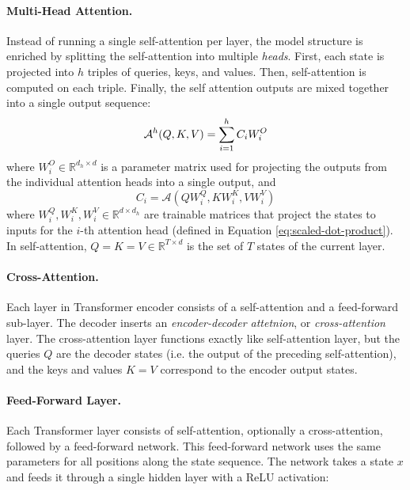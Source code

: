 \paragraph{Multi-Head Attention.} Instead of running a single self-attention
per layer, the model structure is enriched by splitting the self-attention into
multiple \emph{heads}. First, each state is projected into $h$ triples of
queries, keys, and values. Then, self-attention is computed on each triple.
Finally, the self attention outputs are mixed together into a single output
sequence:
%
\begin{equation}
  \mathcal{A}^h(Q, K, V) = \sum_{i=1}^h C_i W_i^O \\
\end{equation}
%
where $W_i^O \in \mathbb{R}^{d_h \times d}$ is a parameter matrix used for
projecting the outputs from the individual attention heads into a single
output, and
%
\begin{equation}
  C_i = \mathcal{A}(QW_i^Q, KW_i^K, VW_i^V)
\end{equation}
where $W_i^Q, W_i^K, W_i^V \in \mathbb{R}^{d \times d_h}$ are trainable
matrices that project the states to inputs for the $i$-th attention head
(defined in Equation \ref{eq:scaled-dot-product}). In self-attention,
$Q = K = V \in \mathbb{R}^{T \times d}$ is the set of $T$ states of the current
layer.

\paragraph{Cross-Attention.} Each layer in Transformer encoder consists of a
self-attention and a feed-forward sub-layer. The decoder inserts an
\emph{encoder-decoder attetnion}, or \emph{cross-attention} layer.  The
cross-attention layer functions exactly like self-attention layer, but the
queries $Q$ are the decoder states (i.e. the output of the preceding
self-attention), and the keys and values $K = V$ correspond to the encoder
output states.

\paragraph{Feed-Forward Layer.} Each Transformer layer consists
of self-attention, optionally a cross-attention, followed by a feed-forward
network. This feed-forward network uses the same parameters for all positions
along the state sequence. The network takes a state $x$ and feeds it through a
single hidden layer with a ReLU activation:

